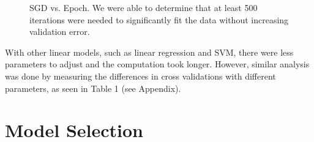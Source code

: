 \begin{itemize}
\begin{itemize}
\begin{figure}[H]
\caption{SGD vs. Epoch. We were able to determine that at least 500 iterations were needed to significantly fit the data without increasing validation error.}
\end{figure}
With other linear models, such as linear regression and SVM, there were less parameters to adjust and the computation took longer. However, similar analysis was done by measuring the differences in cross validations with different parameters, as seen in Table 1 (see Appendix).
\end{itemize}

\end{itemize}



\section{Model Selection}
\medskip
